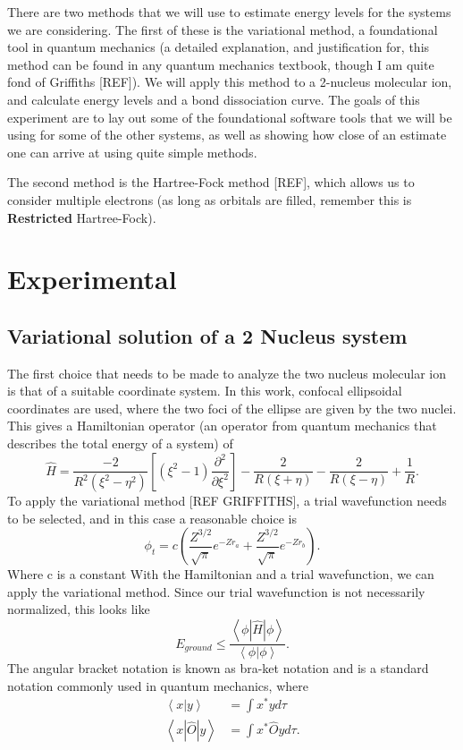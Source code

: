 \documentclass[journal=jacsat,manuscript=communication]{achemso}
\begin{document}
There are two methods that we will use to estimate energy levels for the systems we are considering.  The first of these is the variational method, a foundational tool in quantum mechanics (a detailed explanation, and justification for, this method can be found in any quantum mechanics textbook, though I am quite fond of Griffiths [REF]).  We will apply this method to a 2-nucleus  molecular ion, and calculate energy levels and a bond dissociation curve.  The goals of this experiment are to lay out some of the foundational software tools that we will be using for some of the other systems, as well as showing how close of an estimate one can arrive at using quite simple methods.

The second method is the Hartree-Fock method [REF], which allows us to consider multiple electrons (as long as orbitals are filled, remember this is \textbf{Restricted} Hartree-Fock).  

\section{Experimental}
\subsection{Variational solution of a 2 Nucleus system}
The first choice that needs to be made to analyze the two nucleus  molecular ion is that of a suitable coordinate system.  In this work, confocal ellipsoidal coordinates are used, where the two foci of the ellipse are given by the two nuclei.  This gives a Hamiltonian operator (an operator from quantum mechanics that describes the total energy of a system) of
\begin{equation}
	\hat{H} = \frac{-2}{R^2\left(\xi^2-\eta^2\right)}\left[\left(\xi^2-1\right)\frac{\partial^2 }{\partial\xi^2}\right]-\frac{2}{R(\xi+\eta)}-\frac{2}{R(\xi-\eta)}+\frac{1}{R}.
\end{equation}
To apply the variational method [REF GRIFFITHS], a trial wavefunction needs to be selected, and in this case a reasonable choice is
\begin{equation}
	\phi_t = c\left(\frac{Z^{3/2}}{\sqrt{\pi}}e^{-Zr_a} + \frac{Z^{3/2}}{\sqrt{\pi}}e^{-Zr_b}\right).
\end{equation}
Where c is a constant
With the Hamiltonian and a trial wavefunction, we can apply the variational method.  Since our trial wavefunction is not necessarily normalized, this looks like
\begin{equation}
E_{ground} \leq \frac{\left<\phi | \hat{H} | \phi \right>}{\left<\phi|\phi\right>}.
\end{equation} 
The angular bracket notation is known as bra-ket notation and is a standard notation commonly used in quantum mechanics, where
\begin{align}
	\left<x|y\right> &= \int x^* y d\tau \\
	\left<x|\hat{O}|y\right> &= \int x^* \hat{O}yd\tau.
\end{align}
\end{document}
